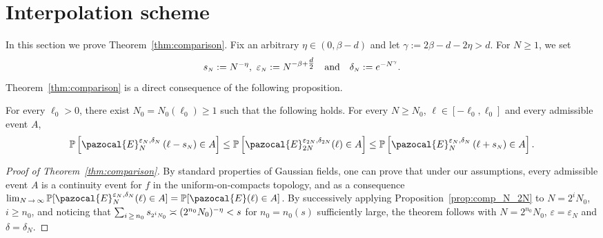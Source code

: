 \documentclass[AHL,Unicode,longabstracts,published]{cedram}
\renewcommand{\P}{\mathbb{P}}
\newcommand{\si}[1]{{\mathchoice{}{}{\scriptscriptstyle}{}#1}}
\newcommand{\sN}{{\mathchoice{}{}{\scriptscriptstyle}{}N}}
\begin{document}
\section{Interpolation scheme}\label{sec:interpolation}

In this section we prove Theorem~\ref{thm:comparison}. Fix an arbitrary $\eta\in(0,\beta-d)$ and let $\gamma:=2\beta-d-2\eta>d$. For $N\geq1$, we set
\begin{equation}\label{eq:choice_parameters}
s_{\sN}:=N^{-\eta},~\varepsilon_{\sN}:=N^{-\beta+\tfrac{d}{2}}\quad\text{and}\quad \delta_{\sN}:=e^{-N^\gamma}.
\end{equation}
Theorem~\ref{thm:comparison} is a direct consequence of the following proposition.

\begin{prop}\label{prop:comp_N_2N}
For every $\ell_0>0$, there exist $N_0=N_0(\ell_0)\geq1$ such that the following holds. For every $N\geq N_0$, $\ell\in[-\ell_0,\ell_0]$ and every admissible event $A$,
\begin{equation}\label{eq:comp_N_2N}
\P\left[\pazocal{E}_{N}^{\varepsilon_{\sN}, \delta_{\sN}}\left(\ell-s_{\sN}\right)\in A\right]\leq \P\left[\pazocal{E}_{2N}^{\varepsilon_{\si{2N}}, \delta_{\si{2N}}}(\ell)\in A\right]\leq \P\left[\pazocal{E}_{N}^{\varepsilon_{\sN}, \delta_{\sN}}\left(\ell+s_{\sN}\right)\in A\right].
\end{equation}
\end{prop}

\begin{proof}[Proof of Theorem~\ref{thm:comparison}]
By standard properties of Gaussian fields, one can prove that under our assumptions, every admissible event $A$ is a continuity event for $f$ in the uniform-on-compacts topology, and as a consequence $\lim_{N\,\to\,\infty} \P[\pazocal{E}_{N}^{\varepsilon_{\sN}, \delta_{\sN}}(\ell)\in A]=\P[\pazocal{E}(\ell)\in A]$. By successively applying Proposition~\ref{prop:comp_N_2N} to $N=2^iN_0$, $i\geq n_0$, and noticing that $\sum_{i\,\geq\,n_0} s_\si{2^i N_0}\asymp (2^{n_0} N_0)^{-\eta}< s$ for $n_0=n_0(s)$ sufficiently large, the theorem follows with $N=2^{n_0}N_0$, $\varepsilon=\varepsilon_{N}$ and $\delta=\delta_{N}$.
\end{proof}
\end{document}
